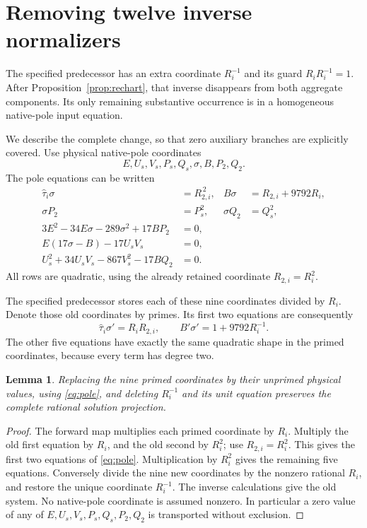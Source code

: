 \documentclass[11pt]{article}
\newtheorem{lemma}[theorem]{Lemma}
\theoremstyle{remark}\newtheorem{remark}[theorem]{Remark}
\begin{document}
\section{Removing twelve inverse normalizers}

The specified predecessor has an extra coordinate
\(R_i^{-1}\) and its guard \(R_i R_i^{-1}=1\). After
Proposition~\ref{prop:rechart}, that inverse disappears from both
aggregate components. Its only remaining substantive occurrence is
in a homogeneous native-pole input equation.

We describe the complete change, so that zero auxiliary branches
are explicitly covered. Use physical native-pole coordinates
\[
           E,U_s,V_s,P_s,Q_s,\sigma,B,P_2,Q_2.
\]
The pole equations can be written
\begin{equation}\label{eq:pole}
\begin{aligned}
 \widehat\tau_i\sigma&=R_{2,i}^{\,2},&
 B\sigma&=R_{2,i}+9792R_i,\\
 \sigma P_2&=P_s^2,&\sigma Q_2&=Q_s^2,\\
 3E^2-34E\sigma-289\sigma^2+17BP_2&=0,\\
 E(17\sigma-B)-17U_sV_s&=0,\\
 U_s^2+34U_sV_s-867V_s^2-17BQ_2&=0.
\end{aligned}
\end{equation}
All rows are quadratic, using the already retained coordinate
\(R_{2,i}=R_i^2\).

The specified predecessor stores each of these nine coordinates
divided by \(R_i\). Denote those old coordinates by primes. Its
first two equations are consequently
\[
 \widehat\tau_i\sigma'=R_iR_{2,i},\qquad
 B'\sigma'=1+9792R_i^{-1}.
\]
The other five equations have exactly the same quadratic shape in
the primed coordinates, because every term has degree two.

\begin{lemma}\label{lem:pole}
Replacing the nine primed coordinates by their unprimed physical
values, using \eqref{eq:pole}, and deleting \(R_i^{-1}\) and its
unit equation preserves the complete rational solution projection.
\end{lemma}
\begin{proof}
The forward map multiplies each primed coordinate by \(R_i\).
Multiply the old first equation by \(R_i\), and the old second
by \(R_i^2\); use \(R_{2,i}=R_i^2\). This gives the first two
equations of \eqref{eq:pole}. Multiplication by \(R_i^2\) gives
the remaining five equations. Conversely divide the nine new
coordinates by the nonzero rational \(R_i\), and restore the
unique coordinate \(R_i^{-1}\). The inverse calculations give
the old system. No native-pole coordinate is assumed nonzero.
In particular a zero value of any of \(E,U_s,V_s,P_s,Q_s,P_2,Q_2\)
is transported without exclusion.
\end{proof}
\end{document}
